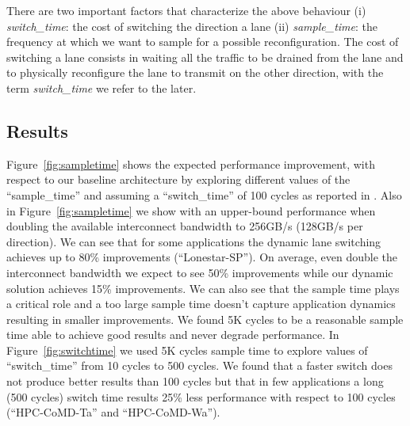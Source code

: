 There are two important factors that characterize the above behaviour (i) 
\emph{switch\_time}: the cost of switching the direction a lane (ii) 
\emph{sample\_time}: the frequency at which we want to sample for a possible 
reconfiguration. The cost of switching a lane consists in waiting all 
the traffic to be drained from the lane and to physically reconfigure the 
lane to transmit on the other direction, with the term \emph{switch\_time} we 
refer to the later. 



\subsection{Results}
Figure~\ref{fig:sampletime} shows the expected performance improvement, with 
respect to our baseline architecture by exploring different values 
of the ``sample\_time'' and assuming a ``switch\_time'' of 100 cycles 
as reported in \cite{REALLY_NEED_REF_HERE}. Also in Figure~\ref{fig:sampletime}
we show with an upper-bound performance when doubling
the available interconnect bandwidth to 256GB/s (128GB/s per direction). 
We can see that for some applications the dynamic lane switching achieves up to
80\% improvements (``Lonestar-SP''). On average, even double the interconnect 
bandwidth we expect to see 50\% improvements while our dynamic solution 
achieves 15\% improvements. We can also see that the sample time plays a 
critical role and a too large sample time doesn't capture application dynamics 
resulting in smaller improvements. We found 5K cycles to be a reasonable sample
time able to achieve good results and never degrade performance. 
In Figure~\ref{fig:switchtime} we used 5K cycles sample time to
explore values of ``switch\_time'' from 10 cycles to 500 cycles.
We found that a faster switch does not produce better results than 100 cycles
but that in few applications a long (500 cycles) switch time results 25\% 
less performance with respect to 100 cycles (``HPC-CoMD-Ta'' and 
``HPC-CoMD-Wa'').




